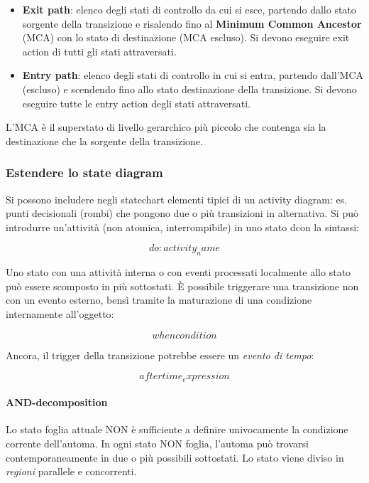 \begin{itemize}
    \item \textbf{Exit path}: elenco degli stati di controllo da cui si esce, partendo dallo stato sorgente della transizione e risalendo fino al \textbf{Minimum Common Ancestor} (MCA) con lo stato di destinazione (MCA escluso). Si devono eseguire exit action di tutti gli stati attraversati.
    \item \textbf{Entry path}: elenco degli stati di controllo in cui si entra, partendo dall'MCA (escluso) e scendendo fino allo stato destinazione della transizione. Si devono eseguire tutte le entry action degli stati attraversati.
\end{itemize}

L'MCA è il superstato di livello gerarchico più piccolo che contenga sia la destinazione che la sorgente della transizione.

\subsubsection{Estendere lo state diagram}

Si possono includere negli statechart elementi tipici di un activity diagram: es. punti decisionali (rombi) che pongono due o più transizioni in alternativa. Si può introdurre un'attività (non atomica, interrompibile) in uno stato dcon la sintassi:

$$do:activity_name$$

Uno stato con una attività interna o con eventi processati localmente allo stato può essere scomposto in più sottostati. È possibile triggerare una transizione non con un evento esterno, bensì tramite la maturazione di una condizione internamente all'oggetto:

$$when condition$$

Ancora, il trigger della transizione potrebbe essere un \textit{evento di tempo}:

$$after time_expression$$


\paragraph{AND-decomposition} Lo stato foglia attuale NON è sufficiente a definire univocamente la condizione corrente dell'automa. In ogni stato NON foglia, l'automa può trovarsi contemporaneamente in due o più possibili sottostati. Lo stato viene diviso in \textit{regioni} parallele e concorrenti.

